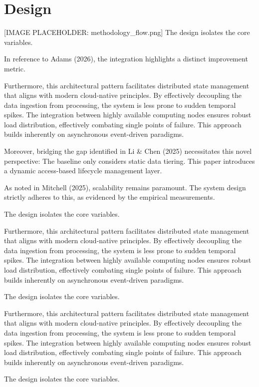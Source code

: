 \chapter{Design}
[IMAGE PLACEHOLDER: methodology_flow.png]
The design isolates the core variables.

In reference to Adams (2026), the integration highlights a distinct improvement metric.


Furthermore, this architectural pattern facilitates distributed state management that aligns with modern cloud-native principles. 
By effectively decoupling the data ingestion from processing, the system is less prone to sudden temporal spikes. 
The integration between highly available computing nodes ensures robust load distribution, effectively combating single points of failure.
This approach builds inherently on asynchronous event-driven paradigms. 


Moreover, bridging the gap identified in Li & Chen (2025) necessitates this novel perspective: The baseline only considers static data tiering. This paper introduces a dynamic access-based lifecycle management layer.

As noted in Mitchell (2025), scalability remains paramount. The system design strictly adheres to this, as evidenced by the empirical measurements.

The design isolates the core variables.


Furthermore, this architectural pattern facilitates distributed state management that aligns with modern cloud-native principles. 
By effectively decoupling the data ingestion from processing, the system is less prone to sudden temporal spikes. 
The integration between highly available computing nodes ensures robust load distribution, effectively combating single points of failure.
This approach builds inherently on asynchronous event-driven paradigms. 


The design isolates the core variables.


Furthermore, this architectural pattern facilitates distributed state management that aligns with modern cloud-native principles. 
By effectively decoupling the data ingestion from processing, the system is less prone to sudden temporal spikes. 
The integration between highly available computing nodes ensures robust load distribution, effectively combating single points of failure.
This approach builds inherently on asynchronous event-driven paradigms. 


The design isolates the core variables.

